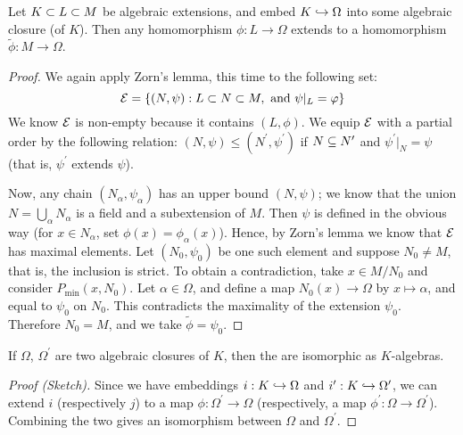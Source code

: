 \begin{thm}
Let $K \subset L \subset M$ be algebraic extensions, and embed $K \hookrightarrow \Omega$ into some algebraic closure (of $K$). Then any homomorphism $\phi: L \to \Omega$ extends to a homomorphism $\tilde{\phi}: M \to \Omega$.
\end{thm}
\begin{proof}
We again apply Zorn's lemma, this time to the following set: \[\mathcal{E} = \left\{(N, \psi) : L \subset N \subset M, \text{ and } \psi|_L = \varphi\right\}\] 
We know $\mathcal{E}$ is non-empty because it contains $(L, \phi)$. We equip $\mathcal{E}$ with a partial order by the following relation: $(N, \psi) \leq (N^\prime, \psi^\prime)$ if $N \subseteq N^\prime$ and $\psi^\prime|_N = \psi$ (that is, $\psi^\prime$ extends $\psi$).

Now, any chain $(N_\alpha, \psi_\alpha)$ has an upper bound $(N, \psi)$; we know that the union $N = \bigcup_{\alpha} N_\alpha$ is a field and a subextension of $M$. 
Then $\psi$ is defined in the obvious way (for $x \in N_\alpha$, set $\phi(x) = \phi_\alpha(x)$).
Hence, by Zorn's lemma we know that $\mathcal{E}$ has maximal elements.
Let $(N_0, \psi_0)$ be one such element and suppose $N_0 \neq M$, that is, the inclusion is strict.
To obtain a contradiction, take $x \in M / N_0$ and consider $P_{\min}(x, N_0)$.
Let $\alpha \in \Omega$, and define a map $N_0(x) \to \Omega$ by $x \mapsto \alpha$, and equal to $\psi_0$ on $N_0$. 
This contradicts the maximality of the extension $\psi_0$.
Therefore $N_0 = M$, and we take $\tilde{\phi} = \psi_0$.
\end{proof}

\begin{cor}
If $\Omega$, $\Omega^\prime$ are two algebraic closures of $K$, then the are isomorphic as $K$-algebras.
\end{cor}
\begin{proof}[Proof (Sketch)]
Since we have embeddings $i: K \hookrightarrow \Omega$ and $i^\prime: K \hookrightarrow \Omega^\prime$, we can extend $i$ (respectively $j$) to a map $\phi: \Omega^\prime \to \Omega$ (respectively, a map $\phi^\prime: \Omega \to \Omega^\prime$). Combining the two gives an isomorphism between $\Omega$ and $\Omega^\prime$.
\end{proof}